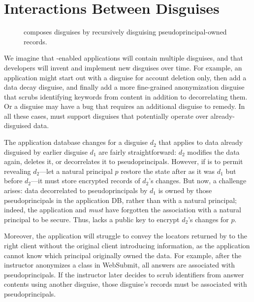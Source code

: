 \section{Interactions Between Disguises}
\label{s:composition}

\begin{figure}[t]
    \centering
    \caption{\sys composes disguises by recursively disguising
             pseudoprincipal-owned records.}
    \label{f:recursive}
\end{figure}

%
We imagine that \sys-enabled applications will contain multiple
disguises, and that developers will invent and implement new disguises
over time.
%
For example, an application might start out with a disguise for account
deletion only, then add a data decay disguise, and finally add a more
fine-grained anonymization disguise that scrubs identifying keywords
from content in addition to decorrelating them.
%
Or a disguise may have a bug that requires an additional disguise
to remedy.
%
In all these cases, \sys must support disguises that potentially
operate over already-disguised data.
%

%
The application database changes for a disguise $d_2$ that applies
to data already disguised by earlier disguise $d_1$ are fairly
straightforward: $d_2$ modifies the data again, deletes it, or
decorrelates it to pseudoprincipals.
%
However, if \sys is to permit revealing $d_2$---\ie let a natural
principal $p$ restore the state after as it was $d_1$ but before
$d_2$---it must store encrypted records of $d_2$'s changes.
%
But now, a challenge arises: data decorrelated to pseudoprincipals
by $d_1$ is owned by those pseudoprincipals in the application
DB, rather than with a natural principal; indeed, the application
and \sys \emph{must} have forgotten the association with a natural
principal to be secure.
%
Thus, \sys lacks a public key to encrypt $d_2$'s changes for $p$.
%

%
Moreover, the application will struggle to convey the locators returned by \sys to the right client
without the original client introducing information, as the application cannot know which principal
originally owned the data.
%
For example, after the instructor anonymizes a class in WebSubmit, all
answers are associated with pseudoprincipals.
%
If the instructor later decides to scrub identifiers from answer contents
using another disguise, those disguise's records must be associated with
pseudoprincipals.
%
%

